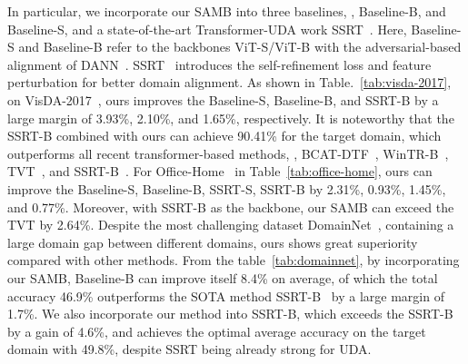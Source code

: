 \documentclass[journal]{IEEEtran}
\begin{document}
In particular, we incorporate our SAMB into three baselines, \ieno, Baseline-B, and Baseline-S, and a state-of-the-art Transformer-UDA work SSRT~\cite{sun2022safeSSRT}. Here, Baseline-S and Baseline-B refer to the backbones ViT-S/ViT-B with the adversarial-based alignment of DANN~\cite{ganin2016domain_dann}. SSRT~\cite{sun2022safeSSRT} introduces the self-refinement loss and feature perturbation for better domain alignment. As shown in Table.~\ref{tab:visda-2017}, on VisDA-2017~\cite{peng2017visdaViSDA2017}, ours improves the Baseline-S, Baseline-B, and SSRT-B by a large margin of 3.93\%, 2.10\%, and 1.65\%, respectively. It is noteworthy that the SSRT-B combined with ours can achieve 90.41\% for the target domain, which outperforms all recent transformer-based methods, \egno, BCAT-DTF~\cite{wang2022domainBCAT}, WinTR-B~\cite{ma2021exploitingWinTR}, TVT~\cite{yang2021tvtTVT}, and SSRT-B~\cite{sun2022safeSSRT}. For Office-Home~\cite{venkateswara2017deepOffice-Home} in Table~\ref{tab:office-home}, ours can improve the Baseline-S, Baseline-B, SSRT-S, SSRT-B by  2.31\%, 0.93\%, 1.45\%, and 0.77\%. Moreover, with SSRT-B as the backbone, our SAMB can exceed the TVT by 2.64\%.  
Despite the most challenging dataset DomainNet~\cite{peng2019momentDomainNet}, containing a large domain gap between different domains, ours shows great superiority compared with other methods. From the table~\ref{tab:domainnet}, by incorporating our SAMB, Baseline-B can improve itself 8.4\% on average, of which the total accuracy 46.9\% outperforms the SOTA method SSRT-B~\cite{sun2022safeSSRT} by a large margin of 1.7\%. We also incorporate our method into SSRT-B, which exceeds the SSRT-B by a gain of 4.6\%, and achieves the optimal average accuracy on the target domain with 49.8\%, despite SSRT being already strong for UDA. 
\end{document}

